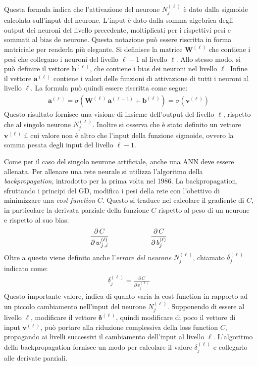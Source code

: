 \noindent Questa formula indica che l'attivazione del neurone $N^{(\ell)}_j$ è dato dalla sigmoide calcolata sull'input del neurone. L'input è dato dalla somma algebrica degli output dei neuroni del livello precedente, moltiplicati per i rispettivi pesi e sommati al bias de neurone. Questa notazione può essere riscritta in forma matriciale per renderla più elegante. Si definisce la matrice $\mathbf{W}^{(\ell)}$ che contiene i pesi che collegano i neuroni del livello $\ell-1$ al livello $\ell$. Allo stesso modo, si può definire il vettore $\mathbf{b}^{(\ell)}$, che contiene i bias dei neuroni nel livello $\ell$. Infine il vettore $\mathbf{a}^{(\ell)}$ contiene i valori delle funzioni di attivazione di tutti i neuroni al livello $\ell$. La formula può quindi essere riscritta come segue:
% 
\begin{gather*}
    \mathbf{a}^{(\ell)} = \sigma\left( \mathbf{W}^{(\ell)}\, \mathbf{a}^{(\ell -1)} + \mathbf{b}^{(\ell)}\right) = \sigma\left( \mathbf{v}^{(\ell)}\right)
\end{gather*}
% 
\noindent Questo risultato fornisce una visione di insieme dell'output del livello $\ell$, rispetto che al singolo neurone $N^{(\ell)}_j$. Inoltre si osserva che è stato definito un vettore $\mathbf{v}^{(\ell)}$ il cui valore non è altro che l'input della funzione sigmoide, ovvero la somma pesata degli input del livello $\ell - 1$.

Come per il caso del singolo neurone artificiale, anche una \acs{ANN} deve essere allenata. Per allenare una rete neurale si utilizza l'algoritmo della \textit{backpropagation}, introdotto per la prima volta nel 1986. La backpropagation, sfruttando i principi del \acs{GD}, modifica i pesi della rete con l'obettivo di minimizzare una \textsl{cost function} $C$. Questo si traduce nel calcolare il gradiente di $C$, in particolare la derivata parziale della funzione $C$ rispetto al peso di un neurone e rispetto al suo bias:
% 
\begin{gather*}
    \frac{\partial\,C}{\partial\,w^{(\ell)}_{j\,,i}}
    \hspace{60px}
    \frac{\partial\,C}{\partial\,b^{(\ell)}_j}
\end{gather*}
% 
\noindent Oltre a questo viene definito anche l'\textsl{errore del neurone} $N^{(\ell)}_j$, chiamato $\delta^{(\ell)}_j$ indicato come:
% 
\begin{gather*}
    \delta^{(\ell)}_j = \frac{\partial\,C}{\partial\,v^{(\ell)}_j}
\end{gather*}
% 
\noindent Questo importante valore, indica di quanto varia la cost function in rapporto ad un piccolo cambiamento nell'input del neurone $N^{(\ell)}_j$. Supponendo di essere al livello $\ell$, modificare il vettore $\boldsymbol{\delta}^{(\ell)}$, quindi modificare di poco il vettore di input $\mathbf{v}^{(\ell)}$, può portare alla riduzione complessiva della loss function $C$, propagando ai livelli successivi il cambiamento dell'input al livello $\ell$. L'algoritmo della backpropagation fornisce un modo per calcolare il valore $\delta^{(\ell)}_j$ e collegarlo alle derivate parziali.

